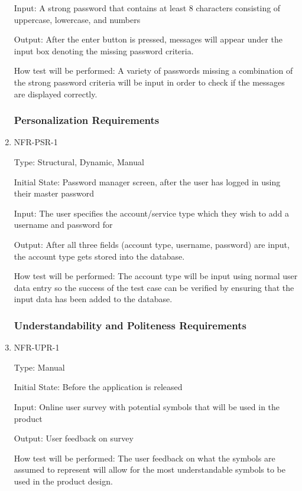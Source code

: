 \documentclass[12pt, titlepage]{article}
\begin{document}
\begin{enumerate}
Input: A strong password that contains at least 8 characters consisting of uppercase, lowercase, and numbers

Output: After the enter button is pressed, messages will appear under the input box denoting the missing password criteria.

How test will be performed: A variety of passwords missing a combination of the strong password criteria will be input in order to check if the messages are displayed correctly.

\subsubsection{Personalization Requirements}

\item{NFR-PSR-1\\}

Type: Structural, Dynamic, Manual

Initial State: Password manager screen, after the user has logged in using their master password

Input: The user specifies the account/service type which they wish to add a username and password for

Output: After all three fields (account type, username, password) are input, the account type gets stored into the database.

How test will be performed: The account type will be input using normal user data entry so the success of the test case can be verified by ensuring that the input data has been added to the database.

\subsubsection{Understandability and Politeness Requirements}

\item{NFR-UPR-1\\}

Type: Manual

Initial State: Before the application is released

Input: Online user survey with potential symbols that will be used in the product

Output: User feedback on survey

How test will be performed: The user feedback on what the symbols are assumed to represent will allow for the most understandable symbols to be used in the product design.


\end{enumerate}
\end{document}
